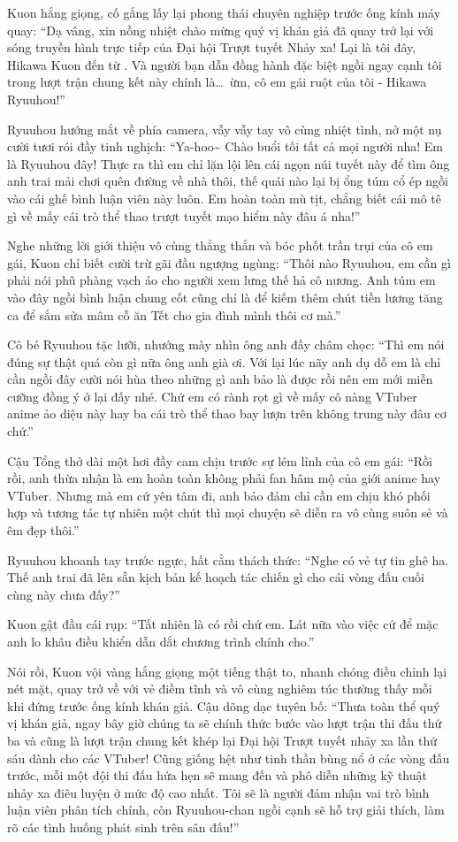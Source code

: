 \documentclass[../main.tex]{subfiles}
\begin{document}
Kuon hắng giọng, cố gắng lấy lại phong thái chuyên nghiệp trước ống kính máy quay: ``Dạ vâng, xin nồng nhiệt chào mừng quý vị khán giả đã quay trở lại với sóng truyền hình trực tiếp của Đại hội Trượt tuyết Nhảy xa! Lại là tôi đây, Hikawa Kuon đến từ \hll. Và người bạn dẫn đồng hành đặc biệt ngồi ngay cạnh tôi trong lượt trận chung kết này chính là\dots\ ừm, cô em gái ruột của tôi - Hikawa Ryuuhou!''

Ryuuhou hướng mắt về phía camera, vẫy vẫy tay vô cùng nhiệt tình, nở một nụ cười tươi rói đầy tinh nghịch: ``Ya-hoo\~{} Chào buổi tối tất cả mọi người nha! Em là Ryuuhou đây! Thực ra thì em chỉ lặn lội lên cái ngọn núi tuyết này để tìm ông anh trai mải chơi quên đường về nhà thôi, thế quái nào lại bị ổng túm cổ ép ngồi vào cái ghế bình luận viên này luôn. Em hoàn toàn mù tịt, chẳng biết cái mô tê gì về mấy cái trò thể thao trượt tuyết mạo hiểm này đâu á nha!''

Nghe những lời giới thiệu vô cùng thẳng thắn và bóc phốt trần trụi của cô em gái, Kuon chỉ biết cười trừ gãi đầu ngượng ngùng: ``Thôi nào Ryuuhou, em cần gì phải nói phũ phàng vạch áo cho người xem lưng thế hả cô nương. Anh túm em vào đây ngồi bình luận chung cốt cũng chỉ là để kiếm thêm chút tiền lương tăng ca để sắm sửa mâm cỗ ăn Tết cho gia đình mình thôi cơ mà.''

Cô bé Ryuuhou tặc lưỡi, nhướng mày nhìn ông anh đầy châm chọc: ``Thì em nói đúng sự thật quá còn gì nữa ông anh già ơi. Với lại lúc nãy anh dụ dỗ em là chỉ cần ngồi đây cười nói hùa theo những gì anh bảo là được rồi nên em mới miễn cưỡng đồng ý ở lại đấy nhé. Chứ em có rành rọt gì về mấy cô nàng VTuber anime ảo diệu này hay ba cái trò thể thao bay lượn trên không trung này đâu cơ chứ.''

Cậu Tổng thở dài một hơi đầy cam chịu trước sự lém lỉnh của cô em gái: ``Rồi rồi, anh thừa nhận là em hoàn toàn không phải fan hâm mộ của giới anime hay VTuber. Nhưng mà em cứ yên tâm đi, anh bảo đảm chỉ cần em chịu khó phối hợp và tương tác tự nhiên một chút thì mọi chuyện sẽ diễn ra vô cùng suôn sẻ và êm đẹp thôi.''

Ryuuhou khoanh tay trước ngực, hất cằm thách thức: ``Nghe có vẻ tự tin ghê ha. Thế anh trai đã lên sẵn kịch bản kế hoạch tác chiến gì cho cái vòng đấu cuối cùng này chưa đấy?''

Kuon gật đầu cái rụp: ``Tất nhiên là có rồi chứ em. Lát nữa vào việc cứ để mặc anh lo khâu điều khiển dẫn dắt chương trình chính cho.''

Nói rồi, Kuon vội vàng hắng giọng một tiếng thật to, nhanh chóng điều chỉnh lại nét mặt, quay trở về với vẻ điềm tĩnh và vô cùng nghiêm túc thường thấy mỗi khi đứng trước ống kính khán giả. Cậu dõng dạc tuyên bố: ``Thưa toàn thể quý vị khán giả, ngay bây giờ chúng ta sẽ chính thức bước vào lượt trận thi đấu thứ ba và cũng là lượt trận chung kết khép lại Đại hội Trượt tuyết nhảy xa lần thứ sáu dành cho các VTuber! Cũng giống hệt như tinh thần bùng nổ ở các vòng đấu trước, mỗi một đội thi đấu hứa hẹn sẽ mang đến và phô diễn những kỹ thuật nhảy xa điêu luyện ở mức độ cao nhất. Tôi sẽ là người đảm nhận vai trò bình luận viên phân tích chính, còn Ryuuhou-chan ngồi cạnh sẽ hỗ trợ giải thích, làm rõ các tình huống phát sinh trên sân đấu!''
\end{document}
